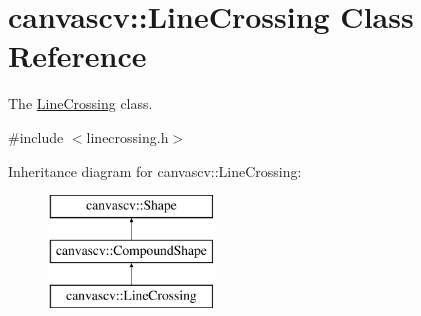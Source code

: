 \hypertarget{classcanvascv_1_1LineCrossing}{}\section{canvascv\+:\+:Line\+Crossing Class Reference}
\label{classcanvascv_1_1LineCrossing}


The \hyperlink{classcanvascv_1_1LineCrossing}{Line\+Crossing} class.  




{\ttfamily \#include $<$linecrossing.\+h$>$}

Inheritance diagram for canvascv\+:\+:Line\+Crossing\+:\begin{figure}[H]
\begin{center}
\leavevmode
\includegraphics[height=3.000000cm]{classcanvascv_1_1LineCrossing}
\end{center}
\end{figure}

